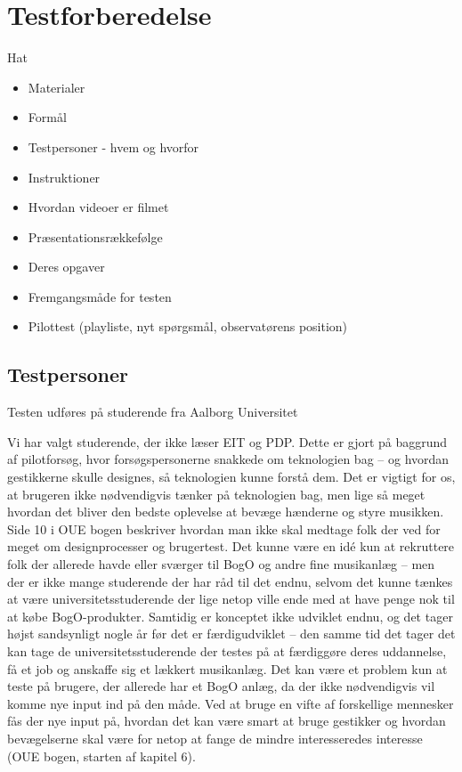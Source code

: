 \section{Testforberedelse}
\label{Testforberedelse}
%
Hat
%
\begin{itemize}
  \item Materialer
  \item Formål
  \item Testpersoner - hvem og hvorfor
  \item Instruktioner
  \item Hvordan videoer er filmet
  \item Præsentationsrækkefølge 
  \item Deres opgaver
  \item Fremgangsmåde for testen 
  \item Pilottest (playliste, nyt spørgsmål, observatørens position)
\end{itemize}
%

\subsection{Testpersoner}
\label{TestpersonerValgAfGestikker}
%
Testen udføres på studerende fra Aalborg Universitet


Vi har valgt studerende, der ikke læser EIT og PDP. Dette er gjort på baggrund af pilotforsøg, hvor forsøgspersonerne snakkede om teknologien bag – og hvordan gestikkerne skulle designes, så teknologien kunne forstå dem. Det er vigtigt for os, at brugeren ikke nødvendigvis tænker på teknologien bag, men lige så meget hvordan det bliver den bedste oplevelse at bevæge hænderne og styre musikken. Side 10 i OUE bogen beskriver hvordan man ikke skal medtage folk der ved for meget om designprocesser og brugertest. 
Det kunne være en idé kun at rekruttere folk der allerede havde eller sværger til BogO og andre fine musikanlæg – men der er ikke mange studerende der har råd til det endnu, selvom det kunne tænkes at være universitetsstuderende der lige netop ville ende med at have penge nok til at købe BogO-produkter. Samtidig er konceptet ikke udviklet endnu, og det tager højst sandsynligt nogle år før det er færdigudviklet – den samme tid det tager det kan tage de universitetsstuderende der testes på at færdiggøre deres uddannelse, få et job og anskaffe sig et lækkert musikanlæg. 
Det kan være et problem kun at teste på brugere, der allerede har et BogO anlæg, da der ikke nødvendigvis vil komme nye input ind på den måde. Ved at bruge en vifte af forskellige mennesker fås der nye input på, hvordan det kan være smart at bruge gestikker og hvordan bevægelserne skal være for netop at fange de mindre interesseredes interesse (OUE bogen, starten af kapitel 6). 
